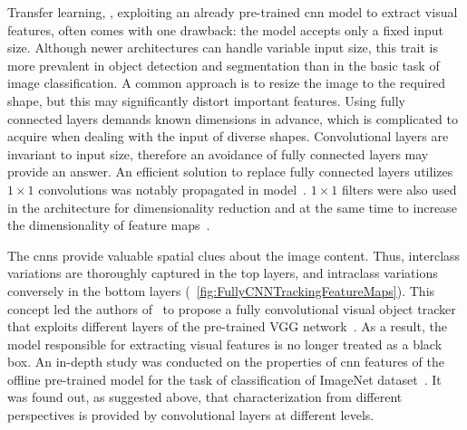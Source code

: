 Transfer learning, \egtext{}, exploiting an already pre-trained \gls{cnn} model to extract visual features, often comes with one drawback: the model accepts only a fixed input size. Although newer architectures can handle variable input size, this trait is more prevalent in object detection and segmentation than in the basic task of image classification. A common approach is to resize the image to the required shape, but this may significantly distort important features. Using fully connected layers demands known dimensions in advance, which is complicated to acquire when dealing with the input of diverse shapes. Convolutional layers are invariant to input size, therefore an avoidance of fully connected layers may provide an answer. An efficient solution to replace fully connected layers utilizes $1 \times 1$ convolutions was notably propagated in  model~\cite{lin2014netinnet}. $1 \times 1$ filters were also used in the  architecture for dimensionality reduction and at the same time to increase the dimensionality of feature maps~\cite{szegedy2015inception}.

The \glspl{cnn} provide valuable spatial clues about the image content. Thus, interclass variations are thoroughly captured in the top layers, and intraclass variations conversely in the bottom layers (\figtext{}~\ref{fig:FullyCNNTrackingFeatureMaps}). This concept led the authors of~\cite{wang2015votcnn} to propose a fully convolutional visual object tracker that exploits different layers of the pre-trained VGG network~\cite{simonyan2015verydeepcnn}. As a result, the model responsible for extracting visual features is no longer treated as a black box. An in-depth study was conducted on the properties of \gls{cnn} features of the offline pre-trained model for the task of classification of ImageNet dataset~\cite{deng2009imagenet}. It was found out, as suggested above, that characterization from different perspectives is provided by convolutional layers at different levels.

